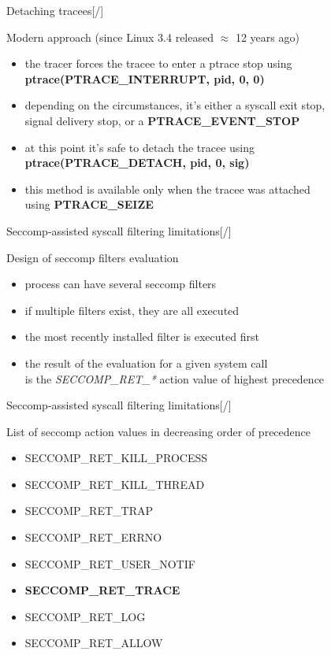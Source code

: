 \documentclass[unicode,aspectratio=169,xcolor={table,dvipsnames,usenames}]{beamer}
\begin{document}
\begin{frame}{\Large Detaching tracees\hfill [\insertframenumber/\inserttotalframenumber]}
\Large
\begin{block}{Modern approach (since Linux 3.4 released $\approx$ 12 years ago)}
\begin{itemize}
	\item the tracer forces the tracee to enter a ptrace stop using
		\textbf{ptrace(PTRACE\_INTERRUPT, pid, 0, 0)}
	\item depending on the circumstances, it's either a syscall exit stop, \\
		signal delivery stop, or a \textbf{PTRACE\_EVENT\_STOP}
	\item at this point it's safe to detach the tracee using \\
		\textbf{ptrace(PTRACE\_DETACH, pid, 0, sig)}
	\item this method is available only when the tracee was attached \\
		using \textbf{PTRACE\_SEIZE}
\end{itemize}
\end{block}
\end{frame}

\begin{frame}{\Large Seccomp-assisted syscall filtering limitations\hfill [\insertframenumber/\inserttotalframenumber]}
\Large
\begin{block}{Design of seccomp filters evaluation}
\begin{itemize}
	\item process can have several seccomp filters
	\item if multiple filters exist, they are all executed
	\item the most recently installed filter is executed first
	\item the result of the evaluation for a given system call \\
		is the \textit{SECCOMP\_RET\_*} action value of highest precedence
\end{itemize}
\end{block}
\end{frame}

\begin{frame}{\Large Seccomp-assisted syscall filtering limitations\hfill [\insertframenumber/\inserttotalframenumber]}
\Large
\begin{block}{List of seccomp action values in decreasing order of precedence}
\begin{itemize}
	\item SECCOMP\_RET\_KILL\_PROCESS
	\item SECCOMP\_RET\_KILL\_THREAD
	\item SECCOMP\_RET\_TRAP
	\item SECCOMP\_RET\_ERRNO
	\item SECCOMP\_RET\_USER\_NOTIF
	\item \textbf{SECCOMP\_RET\_TRACE}
	\item SECCOMP\_RET\_LOG
	\item SECCOMP\_RET\_ALLOW
\end{itemize}
\end{block}
\end{frame}
\end{document}
